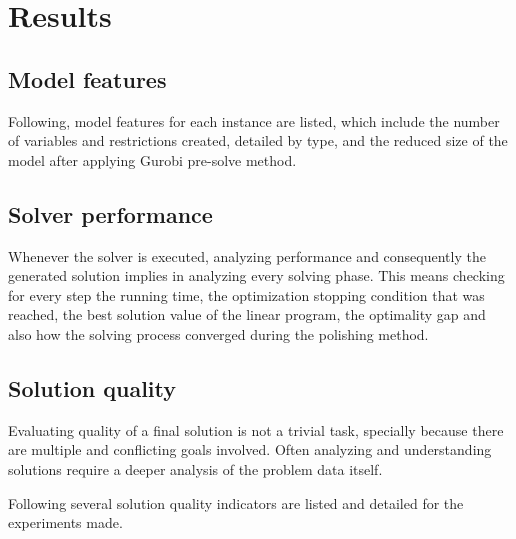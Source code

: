%
%
%



\section{Results}

\subsection{Model features}

Following, model features for each instance are listed, which include the number of variables and restrictions created, detailed by type, and the reduced size of the model after applying Gurobi pre-solve method.


\subsection{Solver performance}

Whenever the solver is executed, analyzing performance and consequently the generated solution implies in analyzing every solving phase. This means checking for every step the running time, the optimization stopping condition that was reached, the best solution value of the linear program, the optimality gap and also how the solving process converged during the polishing method.


\subsection{Solution quality}

Evaluating quality of a final solution is not a trivial task, specially because there are multiple and conflicting goals involved. Often analyzing and understanding solutions require a deeper analysis of the problem data itself.

Following several solution quality indicators are listed and detailed for the experiments made.


